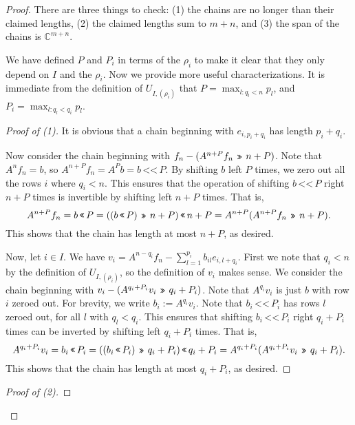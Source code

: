 \documentclass[12pt,psamsfonts]{article}
\newcommand{\leftshift}{\,\texttt{<<}\,}
\newcommand{\rightshift}{\mathbin{\rotatebox[origin=c]{180}{\leftshift}}}
\begin{document}
\begin{proof}
    There are three things to check: (1) the chains are no longer than their claimed lengths, (2) the claimed lengths sum to \(m + n\), and (3) the span of the chains is \(\mathbb{C}^{m + n}\).
    \par We have defined \(P\) and \(P_i\) in terms of the \(\rho_i\) to make it clear that they only depend on \(I\) and the \(\rho_i\).
    Now we provide more useful characterizations.
    It is immediate from the definition of \(U_{I, (\rho_i)}\) that \(P = \max_{l : q_l < n} p_l\), and \(P_i = \max_{l : q_l < q_i} p_l\).
    \begin{proof}[Proof of (1)]
        It is obvious that a chain beginning with \(e_{i, p_i + q_i}\) has length \(p_i + q_i\).
        \par Now consider the chain beginning with \(f_n - (A^{n + P} f_n \rightshift n + P)\).
        Note that \(A^n f_n = b\), so \(A^{n + P} f_n = A^P b = b \leftshift P\).
        By shifting \(b\) left \(P\) times, we zero out all the rows \(i\) where \(q_i < n\).
        This ensures that the operation of shifting \(b \leftshift P\) right \(n + P\) times is invertible by shifting left \(n + P\) times.
        That is,
        \[A^{n + P} f_n = b \leftshift P = ((b \leftshift P) \rightshift n + P) \leftshift n + P = A^{n + P}(A^{n + P}f_n \rightshift n + P).\]
        This shows that the chain has length at most \(n + P\), as desired.
        \par Now, let \(i \in I\).
        We have \(v_i = A^{n - q_i} f_n - \sum_{l = 1}^{p_i} b_{il} e_{i,l + q_i}\).
        First we note that \(q_i < n\) by the definition of \(U_{I, (\rho_i)}\), so the definition of \(v_i\) makes sense.
        We consider the chain beginning with \(v_i - (A^{q_i + P_i} v_i \rightshift q_i + P_i)\).
        Note that \(A^{q_i} v_i\) is just \(b\) with row \(i\) zeroed out.
        For brevity, we write \(b_i := A^{q_i} v_i\).
        Note that \(b_i \leftshift P_i\) has rows \(l\) zeroed out, for all \(l\) with \(q_l < q_i\).
        This ensures that shifting \(b_i \leftshift P_i\) right \(q_i + P_i\) times can be inverted by shifting left \(q_i + P_i\) times.
        That is,
        \[A^{q_i + P_i} v_i = b_i \leftshift P_i = ((b_i \leftshift P_i) \rightshift q_i + P_i) \leftshift q_i + P_i = A^{q_i + P_i}(A^{q_i + P_i} v_i \rightshift q_i + P_i).\]
        This shows that the chain has length at most \(q_i + P_i\), as desired.
    \end{proof}
    \begin{proof}[Proof of (2)]

\end{proof}
\end{proof}
\end{document}
